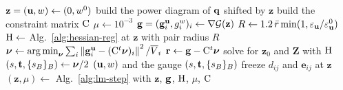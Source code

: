 \documentclass[main.tex]{subfiles}
\begin{document}
\begin{algorithm}[H]
  \caption{Bordered Newton solve of \eqref{eq:flow-line-constraint} (Appendix~\ref{sec:appendix-bordered}).}
  \label{alg:flow-constrained-newton}
  \begin{algorithmic}[1]
    \Require {}
    \State $\mathbf{z} = (\mathbf{u}, w) \gets (0, w^0)$ 
    \State build the power diagram of $\mathbf{q}$ shifted by $\mathbf{z}$ \Comment{\eqref{eq:shifted-site}}
    \State build the constraint matrix $\mathrm{C}$ \Comment{\eqref{eq:appendix-constraint-matrix}}
    \State $\mu \gets 10^{-3}$
      \State $\mathbf{g} = (\mathbf{g}^{\mathbf{u}}_i, g^w_i)_i \gets \nabla\mathcal{G}(\mathbf{z})$ \Comment{\eqref{eq:joint-gradient}}
      \State $R \gets 1.2\,\bar{r}\min(1, \varepsilon_{\mathbf{u}} / \varepsilon^0_{\mathbf{u}})$ 
      \State $\mathrm{H} \gets$ Alg.~\ref{alg:hessian-reg} at $\mathbf{z}$ with pair radius $R$
      \State $\boldsymbol{\nu} \gets \operatorname{arg\,min}_{\boldsymbol{\nu}} \sum_i \left\lVert \mathbf{g}^{\mathbf{u}}_i - (\mathrm{C}^{t}\boldsymbol{\nu})_i \right\rVert^2 / \overline{V}_i$
      \State $\mathbf{r} \gets \mathbf{g} - \mathrm{C}^{t} \boldsymbol{\nu}$ \Comment{\eqref{eq:flow-constrained-newton}}
        \State solve for $\mathbf{z}_0$ and $\mathbf{Z}$ with $\mathrm{H}$ \Comment{\eqref{eq:flow-constrained-elimination-solve}}
        \State $(s, \mathbf{t}, \{s_B\}_B) \gets \boldsymbol{\nu}/2$ 
        \State \Return $(\mathbf{u}, w)$ and the gauge $(s, \mathbf{t}, \{s_B\}_B)$
      \EndIf
      \State freeze $d_{ij}$ and $\mathbf{e}_{ij}$ at $\mathbf{z}$
      \State $(\mathbf{z}, \mu) \gets$ Alg.~\ref{alg:lm-step} with $\mathbf{z}$, $\mathbf{g}$, $\mathrm{H}$, $\mu$, $\mathrm{C}$ \Comment{$\alpha = \infty$}
    \EndFor
  \end{algorithmic}
\end{algorithm}
\end{document}

